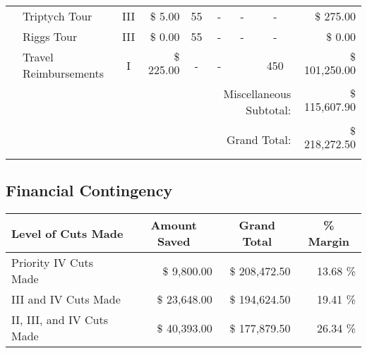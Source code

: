 \begin{tabular}{|clcrccccr|}
     & Triptych Tour             & III                       & $\$$ 5.00                 & 55                        &     -                    &     -                     &     -                     & $\$$ 275.00               \\
     & Riggs Tour                & III                       & $\$$ 0.00                 & 55                        &     -                    &     -                     &     -                     & $\$$ 0.00                 \\
     & Travel Reimbursements     & I                         & $\$$ 225.00               &  -                        &     -                    &                           &  450                      & $\$$ 101,250.00           \\ \hline
     &                           &                           &                           &                           &\multicolumn{3}{r}{Miscellaneous Subtotal:}                                       & $\$$ 115,607.90           \\ \hline\hline
     &                           &                           &                           &                           &                          &                           &                           &                           \\
     &                           &                           &                           &                           &\multicolumn{3}{r}{Grand Total:}                                                  & $\$$218,272.50            \\
     &                           &                           &                           &                           &                          &                           &                           &                           \\ \hline
\end{tabular}

\subsection{Financial Contingency}


\begin{tabular}{lrrr}
  \hline\hline
  \multicolumn{1}{l}{Level of Cuts Made} & \multicolumn{1}{c}{Amount Saved} & \multicolumn{1}{c}{Grand Total} & \multicolumn{1}{c}{\% Margin} \\ \hline\hline 
  Priority IV Cuts Made & $\$$ 9,800.00 & $\$$ 208,472.50 & 13.68 \% \\
  III and IV Cuts Made & $\$$ 23,648.00 &$\$$ 194,624.50 & 19.41 \% \\
  II, III, and IV Cuts Made & $\$$ 40,393.00 & $\$$ 177,879.50 & 26.34 \% \\
  
  \end{tabular}


